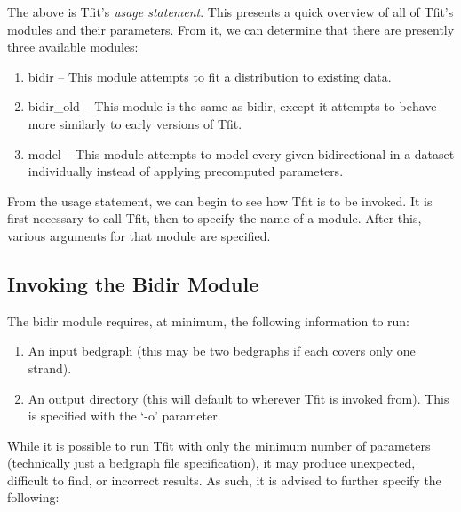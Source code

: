 \documentclass[12pt,letterpaper]{article}
\begin{document}

The above is Tfit's \textit{usage statement}. This presents a quick overview of all of Tfit's modules and their parameters. From it, we can determine that there are presently three available modules:
\begin{enumerate}
\item bidir -- This module attempts to fit a distribution to existing data.
\item bidir\_old -- This module is the same as bidir, except it attempts to behave more similarly to early versions of Tfit.
\item model -- This module attempts to model every given bidirectional in a dataset individually instead of applying precomputed parameters.
\end{enumerate}

From the usage statement, we can begin to see how Tfit is to be invoked. It is first necessary to call Tfit, then to specify the name of a module. After this, various arguments for that module are specified.

\subsection{Invoking the Bidir Module}
The bidir module requires, at minimum, the following information to run:
\begin{enumerate}
\item An input bedgraph (this may be two bedgraphs if each covers only one strand).
\item An output directory (this will default to wherever Tfit is invoked from). This is specified with the `-o' parameter.
\end{enumerate}

While it is possible to run Tfit with only the minimum number of parameters (technically just a bedgraph file specification), it may produce unexpected, difficult to find, or incorrect results. As such, it is advised to further specify the following:
\end{document}
